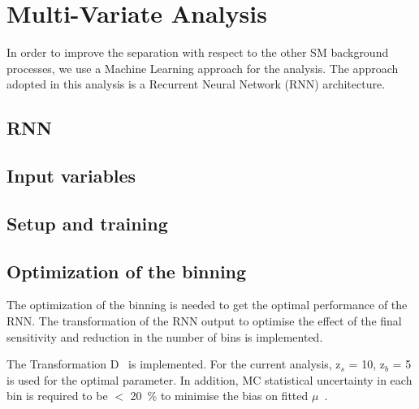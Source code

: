 \chapter{Multi-Variate Analysis}

In order to improve the separation with respect to the other SM background processes, we use a Machine Learning approach for the analysis. The approach adopted in this analysis is a Recurrent Neural Network (RNN) architecture.

\section{RNN}
\section{Input variables}
\section{Setup and training}
\section{Optimization of the binning}
The optimization of the binning is needed to get the optimal performance of the RNN. The transformation of the RNN output to optimise the effect of the final sensitivity and reduction in the number of bins is implemented.

The Transformation D~\cite{ATL-PHYS-PUB-2019-009} is implemented.
For the current analysis, z$_s$ = 10, z$_b$ = 5 is used for the optimal parameter. In addition, MC statistical uncertainty in each bin is required to be $<$ 20~\% to minimise the bias on fitted $\mu$~\cite{ATL-PHYS-PUB-2019-009}.